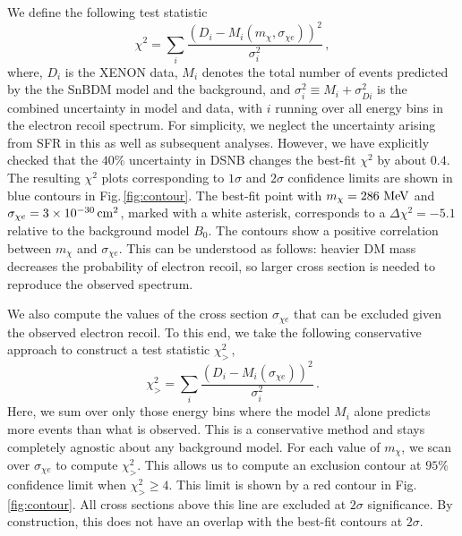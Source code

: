 \documentclass[prd,aps,twocolumn,tightenlines,notitlepage,nofootinbib,preprintnumbers,letterpaper,superscriptaddress]{revtex4-2}
\newcommand{\sbdm}{SnBDM }
\newcommand{\cmsq}{{\rm\,cm^2}}
\newcommand{\MeV}{{\rm\ MeV}}
\newcommand{\mchi}{m_\chi}
\newcommand{\sce}{\sigma_{\chi e}}
\begin{document}
We define the following test statistic
\begin{equation}
    \chi^2 = \sum_i\dfrac{\left(D_i - M_i(\mchi,\sce)\right)^2}{\sigma_i^2}\,,
\end{equation}
where, $D_i$ is the XENON data, $M_i$ denotes the total number of events predicted by the the \sbdm model and the background, and $\sigma_i^2\equiv M_i+\sigma_{Di}^2$ is the combined uncertainty in  model and data, with $i$ running over all energy bins in the electron recoil spectrum. For simplicity, we neglect the uncertainty arising from SFR in this as well as subsequent analyses. However, we have explicitly checked that the $40\%$ uncertainty in DSNB changes the best-fit $\chi^2$ by about $0.4$. The resulting $\chi^2$ plots corresponding to $1\sigma$ and $2\sigma$ confidence limits are shown in blue contours in Fig.\,\ref{fig:contour}. The best-fit point with $\mchi=286\MeV$ and $\sce=3\times 10^{-30}\cmsq$, marked with a white asterisk, corresponds to a  $\Delta\chi^2=-5.1$ relative to the background model $B_0$. The contours show a positive correlation between $\mchi$ and $\sce$. This can be understood as follows: heavier DM mass decreases the probability of electron recoil, so larger cross section is needed to reproduce the observed spectrum.

We also compute the values of the cross section $\sce$ that can be excluded given the observed electron recoil. To this end, we take the following conservative approach to construct a test statistic $\chi_>^2$\,\cite{Ackermann:2015tah},
\begin{equation}
    \chi_>^2 = \sum_i \dfrac{\left(D_i - M_i(\sce)\right)^2}{\sigma_i^2}\,.
\end{equation}
Here, we sum over only those energy bins where the model $M_i$ alone predicts more events than what is observed. This is a conservative method and stays completely agnostic about any background model. For each value of $\mchi$, we scan over $\sce$ to compute $\chi_>^2$. This allows us to compute an exclusion contour at $95\%$ confidence limit when $\chi_>^2 \ge 4$. This limit is shown by a red contour in Fig.\,\ref{fig:contour}. All cross sections above this line are excluded at $2\sigma$ significance. By construction, this does not have an overlap with the best-fit contours at $2\sigma$.
\end{document}
